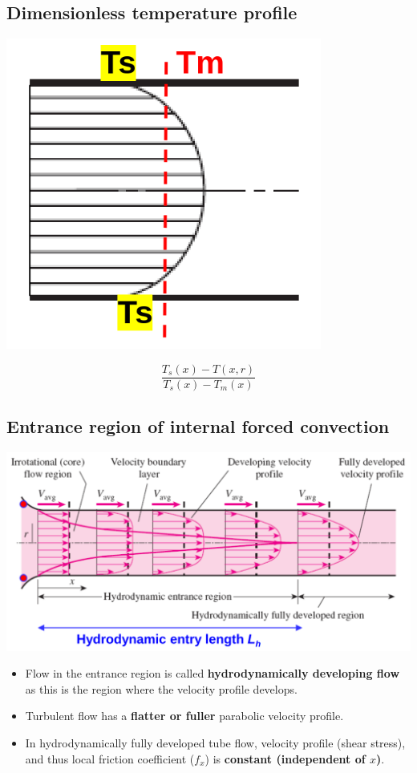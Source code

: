\documentclass[11pt]{article}
\begin{document}
\subsection{Dimensionless temperature profile}
\label{sec:org35a34b3}
\begin{center}
\includegraphics[width=.9\linewidth]{./images/dimensionless-temperature-profile-diagram.png}
\end{center}
\[\frac{T_s (x) - T(x, r)}{T_s (x) - T_m (x)}\]

\subsection{Entrance region of internal forced convection}
\label{sec:org9b06ce0}
\begin{center}
\includegraphics[width=.9\linewidth]{./images/entrance-region-of-internal-forced-convection.png}
\end{center}
\begin{itemize}
\item Flow in the entrance region is called \textbf{hydrodynamically developing flow} as this is the region where the velocity profile develops.
\item Turbulent flow has a \textbf{flatter or fuller} parabolic velocity profile.
\item In hydrodynamically fully developed tube flow, velocity profile (shear stress), and thus local friction coefficient (\(f_x\)) is \textbf{constant (independent of \(x\))}.
\end{itemize}
\end{document}
